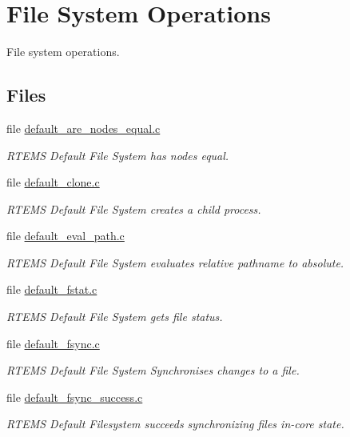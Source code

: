 \hypertarget{group__LibIOFSOps}{}\section{File System Operations}
\label{group__LibIOFSOps}


File system operations.  


\subsection*{Files}
\begin{DoxyCompactItemize}
\item 
file \mbox{\hyperlink{default__are__nodes__equal_8c}{default\+\_\+are\+\_\+nodes\+\_\+equal.\+c}}
\begin{DoxyCompactList}\small\item\em R\+T\+E\+MS Default File System has nodes equal. \end{DoxyCompactList}\item 
file \mbox{\hyperlink{default__clone_8c}{default\+\_\+clone.\+c}}
\begin{DoxyCompactList}\small\item\em R\+T\+E\+MS Default File System creates a child process. \end{DoxyCompactList}\item 
file \mbox{\hyperlink{default__eval__path_8c}{default\+\_\+eval\+\_\+path.\+c}}
\begin{DoxyCompactList}\small\item\em R\+T\+E\+MS Default File System evaluates relative pathname to absolute. \end{DoxyCompactList}\item 
file \mbox{\hyperlink{default__fstat_8c}{default\+\_\+fstat.\+c}}
\begin{DoxyCompactList}\small\item\em R\+T\+E\+MS Default File System gets file status. \end{DoxyCompactList}\item 
file \mbox{\hyperlink{default__fsync_8c}{default\+\_\+fsync.\+c}}
\begin{DoxyCompactList}\small\item\em R\+T\+E\+MS Default File System Synchronises changes to a file. \end{DoxyCompactList}\item 
file \mbox{\hyperlink{default__fsync__success_8c}{default\+\_\+fsync\+\_\+success.\+c}}
\begin{DoxyCompactList}\small\item\em R\+T\+E\+MS Default Filesystem succeeds synchronizing file\textquotesingle{}s in-\/core state. \end{DoxyCompactList}\item 

\end{DoxyCompactItemize}
